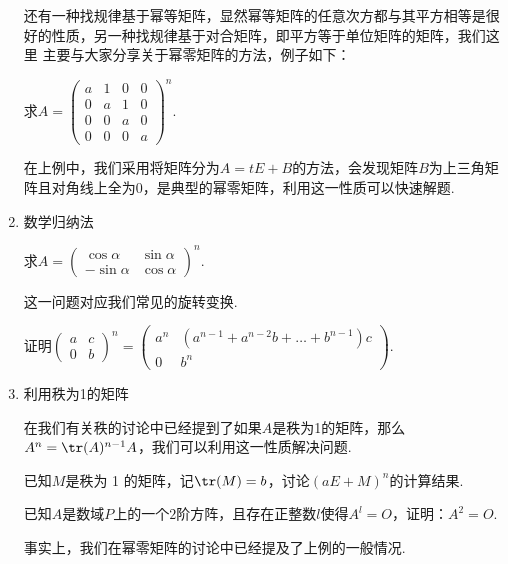 \begin{enumerate}
    还有一种找规律基于幂等矩阵，显然幂等矩阵的任意次方都与其平方相等是很好的性质，另一种找规律基于对合矩阵，即平方等于单位矩阵的矩阵，我们这里
    主要与大家分享关于幂零矩阵的方法，例子如下：
    \begin{example}
        求$A=\begin{pmatrix}a & 1 & 0 & 0 \\ 0 & a & 1 & 0 \\ 0 & 0 & a & 0 \\ 0 & 0 & 0 & a \end{pmatrix}^n$.
    \end{example}
    在上例中，我们采用将矩阵分为$A=tE+B$的方法，会发现矩阵$B$为上三角矩阵且对角线上全为0，是典型的幂零矩阵，利用这一性质可以快速解题.
    \item 数学归纳法
    \begin{example}
        求$A=\begin{pmatrix}\cos\alpha & \sin\alpha \\ -\sin\alpha & \cos\alpha\end{pmatrix}^n$.
    \end{example}
    这一问题对应我们常见的旋转变换.
    \begin{example}
        证明$\begin{pmatrix}
            a & c \\ 0 & b
        \end{pmatrix}^n=\begin{pmatrix}
            a^n & (a^{n-1}+a^{n-2}b+\dots+b^{n-1})c \\ 0 & b^n
        \end{pmatrix}$.
    \end{example}
    \item 利用秩为1的矩阵

    在我们有关秩的讨论中已经提到了如果$A$是秩为1的矩阵，那么$A^n=\tr(A)^{n-1}A$，我们可以利用这一性质解决问题.
    \begin{example}
        已知$M$是秩为 1 的矩阵，记$\tr(M)=b$，讨论$(aE+M)^n$的计算结果.
    \end{example}

    \begin{example}
        已知$A$是数域$P$上的一个$2$阶方阵，且存在正整数$l$使得$A^l=O$，证明：$A^2=O$.
    \end{example}
    事实上，我们在幂零矩阵的讨论中已经提及了上例的一般情况.


\end{enumerate}
